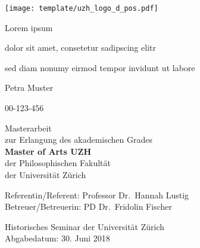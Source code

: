\documentclass[
  12pt,
  nswissgerman,
  twoside,
  openright]{report}
\begin{document}

\begin{titlepage}
    \begin{center}

      \texttt{[image: template/uzh\_logo\_d\_pos.pdf]}

        \vspace*{2.5cm}

        \huge
        {Lorem ipsum}

        \vspace{0.5cm}

        \large
        {dolor sit amet, consetetur sadipscing elitr

sed diam nonumy eirmod tempor invidunt ut labore}

        \vspace{1.5cm}

        \Large
        {Petra Muster}

        \normalsize
        {00-123-456}

        \vspace{1.5cm}

        \normalsize
        Masterarbeit\\
        zur Erlangung des akademischen Grades\\
        \textbf{Master of Arts UZH}\\
        der Philosophischen Fakultät\\
        der Universität Zürich

        \vfill

        \normalsize
        Referentin/Referent: {Professor Dr.~Hannah Lustig}\\
        Betreuer/Betreuerin: {PD Dr.~Fridolin Fischer}\\

        \vspace{0.8cm}

        \normalsize
        {Historisches Seminar der Universität Zürich}\\
        Abgabedatum: {30. Juni 2018}

    \end{center}
\end{titlepage}
\end{document}
